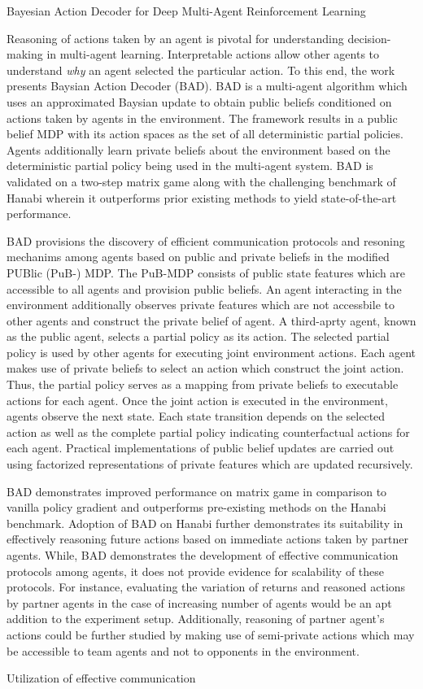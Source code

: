 \documentclass[11pt,letterpaper]{article}
\begin{document}
\begin{center}
  \large{Bayesian Action Decoder for Deep Multi-Agent Reinforcement Learning}
\end{center}

Reasoning of actions taken by an agent is pivotal for understanding decision-making in multi-agent learning. Interpretable actions allow other agents to understand \textit{why} an agent selected the particular action. To this end, the work presents Baysian Action Decoder (BAD). BAD is a multi-agent algorithm which uses an approximated Baysian update to obtain public beliefs conditioned on actions taken by agents in the environment. The framework results in a public belief MDP with its action spaces as the set of all deterministic partial policies. Agents additionally learn private beliefs about the environment based on the deterministic partial policy being used in the multi-agent system. BAD is validated on a two-step matrix game along with the challenging benchmark of Hanabi wherein it outperforms prior existing methods to yield state-of-the-art performance. 

BAD provisions the discovery of efficient communication protocols and resoning mechanims among agents based on public and private beliefs in the modified PUBlic (PuB-) MDP. The PuB-MDP consists of public state features which are accessible to all agents and provision public beliefs. An agent interacting in the environment additionally observes private features which are not accessbile to other agents and construct the private belief of agent. A third-aprty agent, known as the public agent, selects a partial policy as its action. The selected partial policy is used by other agents for executing joint environment actions. Each agent makes use of private beliefs to select an action which construct the joint action. Thus, the partial policy serves as a mapping from private beliefs to executable actions for each agent. Once the joint action is executed in the environment, agents observe the next state. Each state transition depends on the selected action as well as the complete partial policy indicating counterfactual actions for each agent. Practical implementations of public belief updates are carried out using factorized representations of private features which are updated recursively. 

BAD demonstrates improved performance on matrix game in comparison to vanilla policy gradient and outperforms pre-existing methods on the Hanabi benchmark. Adoption of BAD on Hanabi further demonstrates its suitability in effectively reasoning future actions based on immediate actions taken by partner agents. While, BAD demonstrates the development of effective communication protocols among agents, it does not provide evidence for scalability of these protocols. For instance, evaluating the variation of returns and reasoned actions by partner agents in the case of increasing number of agents would be an apt addition to the experiment setup. Additionally, reasoning of partner agent's actions could be further studied by making use of semi-private actions which may be accessible to team agents and not to opponents in the environment. 

Utilization of effective communication
\end{document}
